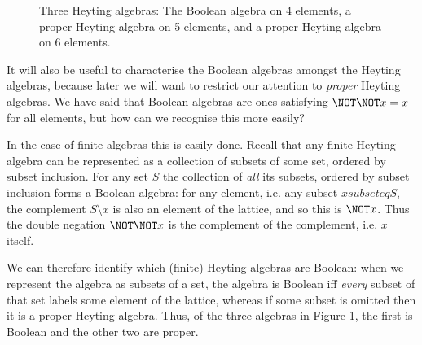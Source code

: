 \begin{figure}[htbp]
\centering
{}
\caption{Three Heyting algebras: The Boolean algebra on 4 elements, a proper Heyting algebra on 5 elements, and a proper Heyting algebra on 6 elements.}\label{fig:3HeytingAlgebras}
\end{figure}


It will also be useful to characterise the Boolean algebras amongst the Heyting algebras, because later we will want to restrict our attention to \emph{proper} Heyting algebras.  We have said that Boolean algebras are ones satisfying $\NOT \NOT x = x$ for all elements, but how can we recognise this more easily?

In the case of finite algebras this is easily done.  Recall that any finite Heyting algebra can be represented as a collection of subsets of some set, ordered by subset inclusion.  For any set $S$ the collection of \emph{all} its subsets, ordered by subset inclusion forms a Boolean algebra: for any element, i.e. any subset $x subseteq S$, the complement $S \setminus x$ is also an element of the lattice, and so this is $\NOT x$.  Thus the double negation $\NOT \NOT x$ is the complement of the complement, i.e. $x$ itself.

We can therefore identify which (finite) Heyting algebras are Boolean: when we represent the algebra as subsets of a set, the algebra is Boolean iff \emph{every} subset of that set labels some element of the lattice, whereas if some subset is omitted then it is a proper Heyting algebra.  Thus, of the three algebras in Figure \ref{fig:3HeytingAlgebras}, the first is Boolean and the other two are proper.

